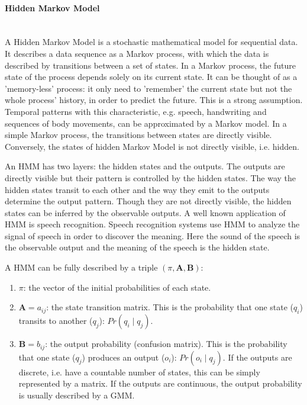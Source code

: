 \paragraph{Hidden Markov Model} ~\\
A Hidden Markov Model is a stochastic mathematical model for sequential data. It describes a data sequence as a Markov process, with which the data is described by transitions between a set of states. In a Markov process, the future state of the process depends solely on its current state. It can be thought of as a 'memory-less' process: it only need to 'remember' the current state but not the whole process' history, in order to predict the future. This is a strong assumption.
Temporal patterns with this characteristic, e.g. speech, handwriting and sequences of body movements, can be approximated by a Markov model. In a simple Markov process, the transitions between states are directly visible. Conversely, the states of hidden Markov Model is not directly visible, i.e. hidden.

An HMM has two layers: the hidden states and the outputs. The outputs are directly visible but their pattern is controlled by the hidden states. The way the hidden states transit to each other and the way they emit to the outputs determine the output pattern. Though they are not directly visible, the hidden states can be inferred by the observable outputs. A well known application of HMM is speech recognition. Speech recognition systems use HMM to analyze the signal of speech in order to discover the meaning. Here the sound of the speech is the observable output and the meaning of the speech is the hidden state.


A HMM can be fully described by a triple $\left(\pi,\boldsymbol{A},\boldsymbol{B}\right)$:

\begin{enumerate}
\item $\pi$: the vector of the initial probabilities of each state.
\item $\boldsymbol{A}={a_{ij}}$: the state transition matrix. This is the probability that one state ($q_i$) transits to another ($q_j$): $Pr\left(q_i{\mid}q_j\right)$.
\item $\boldsymbol{B}={b_{ij}}$: the output probability (confusion matrix). This is the probability that one state ($q_j$) produces an output ($o_i$): $Pr\left(o_i{\mid}q_{j}\right)$. If the outputs are discrete, i.e. have a countable number of states, this can be simply represented by a matrix. If the outputs are continuous, the output probability is usually described by a GMM.
\end{enumerate}

